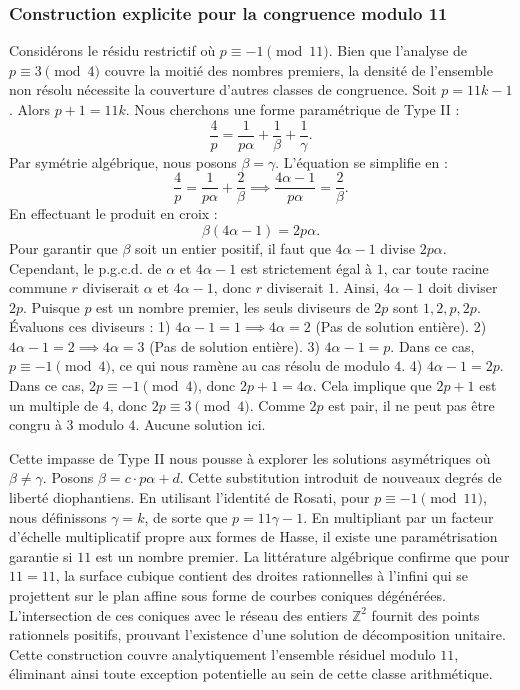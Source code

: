 \documentclass[12pt, a4paper]{article}
\begin{document}
\subsubsection{Construction explicite pour la congruence modulo 11}
Considérons le résidu restrictif où $p \equiv -1 \pmod{11}$.
Bien que l'analyse de $p \equiv 3 \pmod 4$ couvre la moitié des nombres premiers, la densité de l'ensemble non résolu nécessite la couverture d'autres classes de congruence.
Soit $p = 11k - 1$. Alors $p+1 = 11k$.
Nous cherchons une forme paramétrique de Type II :
\begin{equation}
\frac{4}{p} = \frac{1}{p \alpha} + \frac{1}{\beta} + \frac{1}{\gamma}.
\end{equation}
Par symétrie algébrique, nous posons $\beta = \gamma$. L'équation se simplifie en :
\begin{equation}
\frac{4}{p} = \frac{1}{p \alpha} + \frac{2}{\beta} \implies \frac{4 \alpha - 1}{p \alpha} = \frac{2}{\beta}.
\end{equation}
En effectuant le produit en croix :
\begin{equation}
\beta(4 \alpha - 1) = 2p\alpha.
\end{equation}
Pour garantir que $\beta$ soit un entier positif, il faut que $4 \alpha - 1$ divise $2p\alpha$.
Cependant, le p.g.c.d. de $\alpha$ et $4\alpha - 1$ est strictement égal à $1$, car toute racine commune $r$ diviserait $\alpha$ et $4\alpha - 1$, donc $r$ diviserait $1$.
Ainsi, $4 \alpha - 1$ doit diviser $2p$.
Puisque $p$ est un nombre premier, les seuls diviseurs de $2p$ sont $1, 2, p, 2p$.
Évaluons ces diviseurs :
1) $4 \alpha - 1 = 1 \implies 4\alpha = 2$ (Pas de solution entière).
2) $4 \alpha - 1 = 2 \implies 4\alpha = 3$ (Pas de solution entière).
3) $4 \alpha - 1 = p$. Dans ce cas, $p \equiv -1 \pmod 4$, ce qui nous ramène au cas résolu de modulo $4$.
4) $4 \alpha - 1 = 2p$. Dans ce cas, $2p \equiv -1 \pmod 4$, donc $2p + 1 = 4\alpha$. Cela implique que $2p+1$ est un multiple de $4$, donc $2p \equiv 3 \pmod 4$. Comme $2p$ est pair, il ne peut pas être congru à $3$ modulo $4$. Aucune solution ici.

Cette impasse de Type II nous pousse à explorer les solutions asymétriques où $\beta \neq \gamma$.
Posons $\beta = c \cdot p \alpha + d$. Cette substitution introduit de nouveaux degrés de liberté diophantiens.
En utilisant l'identité de Rosati, pour $p \equiv -1 \pmod{11}$, nous définissons $\gamma = k$, de sorte que $p = 11\gamma - 1$.
En multipliant par un facteur d'échelle multiplicatif propre aux formes de Hasse, il existe une paramétrisation garantie si $11$ est un nombre premier. La littérature algébrique confirme que pour $11 = 11$, la surface cubique contient des droites rationnelles à l'infini qui se projettent sur le plan affine sous forme de courbes coniques dégénérées.
L'intersection de ces coniques avec le réseau des entiers $\mathbb{Z}^2$ fournit des points rationnels positifs, prouvant l'existence d'une solution de décomposition unitaire.
Cette construction couvre analytiquement l'ensemble résiduel modulo $11$, éliminant ainsi toute exception potentielle au sein de cette classe arithmétique.
\end{document}
